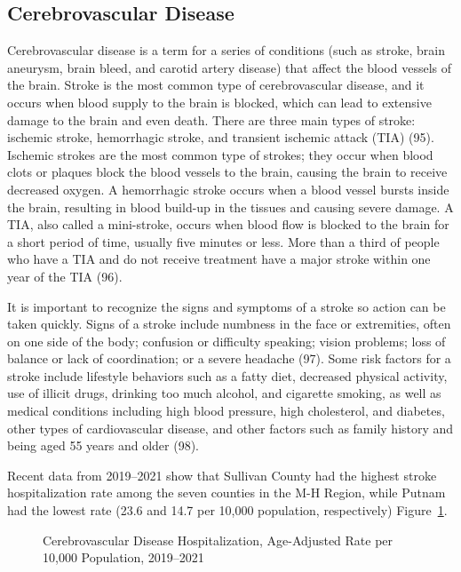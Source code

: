 \documentclass[
  english,
  letterpaper,
]{report}
\begin{document}
\subsection{Cerebrovascular Disease}\label{cerebrovascular-disease}

Cerebrovascular disease is a term for a series of conditions (such as
stroke, brain aneurysm, brain bleed, and carotid artery disease) that
affect the blood vessels of the brain. Stroke is the most common type of
cerebrovascular disease, and it occurs when blood supply to the brain is
blocked, which can lead to extensive damage to the brain and even death.
There are three main types of stroke: ischemic stroke, hemorrhagic
stroke, and transient ischemic attack (TIA) (95). Ischemic strokes are
the most common type of strokes; they occur when blood clots or plaques
block the blood vessels to the brain, causing the brain to receive
decreased oxygen. A hemorrhagic stroke occurs when a blood vessel bursts
inside the brain, resulting in blood build-up in the tissues and causing
severe damage. A TIA, also called a mini-stroke, occurs when blood flow
is blocked to the brain for a short period of time, usually five minutes
or less. More than a third of people who have a TIA and do not receive
treatment have a major stroke within one year of the TIA (96).

It is important to recognize the signs and symptoms of a stroke so
action can be taken quickly. Signs of a stroke include numbness in the
face or extremities, often on one side of the body; confusion or
difficulty speaking; vision problems; loss of balance or lack of
coordination; or a severe headache (97). Some risk factors for a stroke
include lifestyle behaviors such as a fatty diet, decreased physical
activity, use of illicit drugs, drinking too much alcohol, and cigarette
smoking, as well as medical conditions including high blood pressure,
high cholesterol, and diabetes, other types of cardiovascular disease,
and other factors such as family history and being aged 55 years and
older (98).

Recent data from 2019--2021 show that Sullivan County had the highest
stroke hospitalization rate among the seven counties in the M-H Region,
while Putnam had the lowest rate (23.6 and 14.7 per 10,000 population,
respectively) Figure~\ref{fig-cerebrovasdz-hospital-aar}.

\begin{figure}


\caption{\label{fig-cerebrovasdz-hospital-aar}Cerebrovascular Disease
Hospitalization, Age-Adjusted Rate per 10,000 Population, 2019--2021}

\end{figure}%
\end{document}
